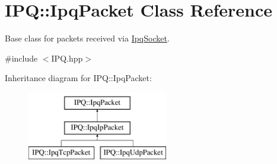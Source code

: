 \hypertarget{classIPQ_1_1IpqPacket}{
\section{\-I\-P\-Q\-:\-:\-Ipq\-Packet \-Class \-Reference}
\label{classIPQ_1_1IpqPacket}
}


\-Base class for packets received via \hyperlink{classIPQ_1_1IpqSocket}{\-Ipq\-Socket}.  




{\ttfamily \#include $<$\-I\-P\-Q.\-hpp$>$}

\-Inheritance diagram for \-I\-P\-Q\-:\-:\-Ipq\-Packet\-:\begin{figure}[H]
\begin{center}
\leavevmode
\includegraphics[height=3.000000cm]{classIPQ_1_1IpqPacket}
\end{center}
\end{figure}
